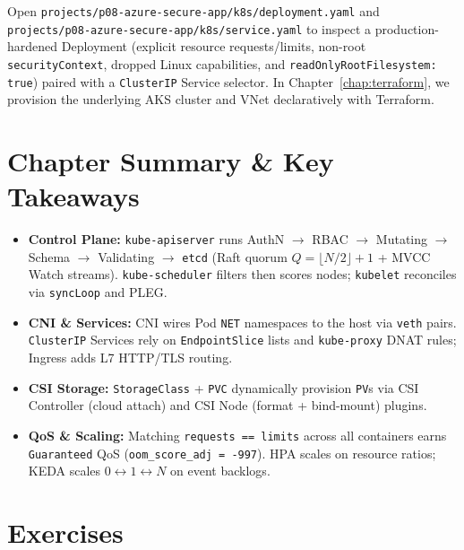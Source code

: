 \begin{labbridgebox}
Open \texttt{projects/p08-azure-secure-app/k8s/deployment.yaml} and \texttt{projects/p08-azure-secure-app/k8s/service.yaml} to inspect a production-hardened Deployment (explicit resource requests/limits, non-root \texttt{securityContext}, dropped Linux capabilities, and \texttt{readOnlyRootFilesystem: true}) paired with a \texttt{ClusterIP} Service selector. In Chapter~\ref{chap:terraform}, we provision the underlying AKS cluster and VNet declaratively with Terraform.
\end{labbridgebox}

\section{Chapter Summary \protect\& Key Takeaways}
\begin{itemize}[leftmargin=15pt]
  \item \textbf{Control Plane:} \texttt{kube-apiserver} runs AuthN $\to$ RBAC $\to$ Mutating $\to$ Schema $\to$ Validating $\to$ \texttt{etcd} (Raft quorum $Q = \lfloor N/2 \rfloor + 1$ + MVCC Watch streams). \texttt{kube-scheduler} filters then scores nodes; \texttt{kubelet} reconciles via \texttt{syncLoop} and PLEG.
  \item \textbf{CNI \& Services:} CNI wires Pod \texttt{NET} namespaces to the host via \texttt{veth} pairs. \texttt{ClusterIP} Services rely on \texttt{EndpointSlice} lists and \texttt{kube-proxy} DNAT rules; Ingress adds L7 HTTP/TLS routing.
  \item \textbf{CSI Storage:} \texttt{StorageClass} + \texttt{PVC} dynamically provision \texttt{PV}s via CSI Controller (cloud attach) and CSI Node (format + bind-mount) plugins.
  \item \textbf{QoS \& Scaling:} Matching \texttt{requests == limits} across all containers earns \texttt{Guaranteed} QoS (\texttt{oom\_score\_adj = -997}). HPA scales on resource ratios; KEDA scales $0 \leftrightarrow 1 \leftrightarrow N$ on event backlogs.
\end{itemize}

\section{Exercises}

